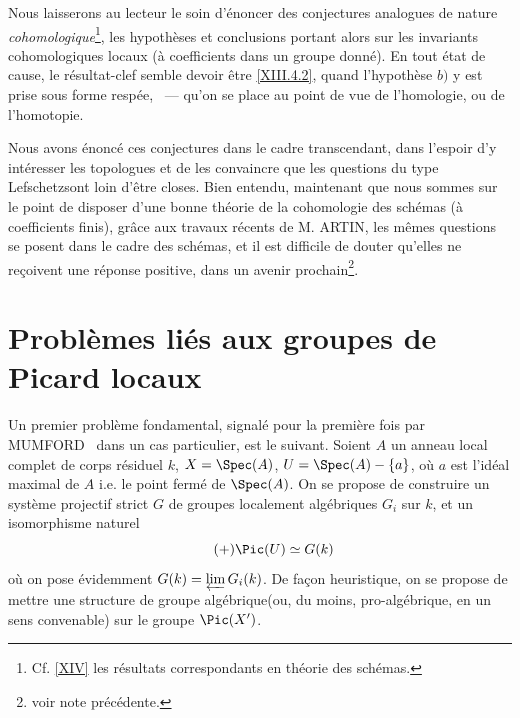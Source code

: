 Nous laisserons au lecteur le soin d'\'enoncer des conjectures analogues de nature \emph{cohomologique}\footnote{Cf. \Exp \ref{XIV} les r\'esultats correspondants en th\'eorie des sch\'emas.}, les hypoth\`eses et conclusions portant alors sur les invariants cohomologiques locaux (\`a coefficients dans un groupe donn\'e). En tout \'etat de cause, le r\'esultat-clef semble devoir \^etre \ref{XIII.4.2}, quand l'hypoth\`ese $b)$ y est prise sous forme resp\'ee, \ --- qu'on se place au point de vue de l'homologie, ou de l'homotopie.

Nous avons \'enonc\'e ces conjectures dans le cadre transcendant, dans
l'espoir d'y int\'eresser les topologues et de les convaincre que
les questions du type \og Lefschetz\fg sont loin d'\^etre closes.
Bien entendu, maintenant que nous sommes sur le point de disposer
d'une bonne th\'eorie de la cohomologie des sch\'emas (\`a coefficients
finis), gr\^ace aux travaux r\'ecents de M. ARTIN, les
m\^emes questions se posent dans le cadre des sch\'emas, et il est
difficile de douter qu'elles ne re\c coivent une r\'eponse positive,
dans un avenir prochain\footnote{voir note pr\'ec\'edente.}.

\section{Probl\`emes li\'es aux groupes de Picard locaux} \label{XIII.5}

Un premier probl\`eme fondamental, signal\'e pour la premi\`ere fois par MUMFORD~\cite{XIII.5} dans un cas particulier, est le suivant. Soient $A$ un anneau local complet de corps r\'esiduel $k$, $X=\Spec(A)$, $U=\Spec(A)-\{a\}$, o\`u $a$ est l'id\'eal maximal de $A$ i.e. le point ferm\'e de $\Spec(A)$. On se propose de construire un syst\`eme projectif strict $G$ de groupes localement alg\'ebriques $G_i$ sur $k$, et un isomorphisme naturel \begin{equation*} \label{eq:XIII.5.+} \tag{$+$} {\Pic(U)\simeq G(k)} \end{equation*} o\`u on pose \'evidemment $G(k)=\varprojlim G_i(k)$. De fa\c con heuristique, on se propose de \og mettre une structure de groupe alg\'ebrique\fg (ou, du moins, pro-alg\'ebrique, en un sens convenable) sur le groupe $\Pic(X')$.

